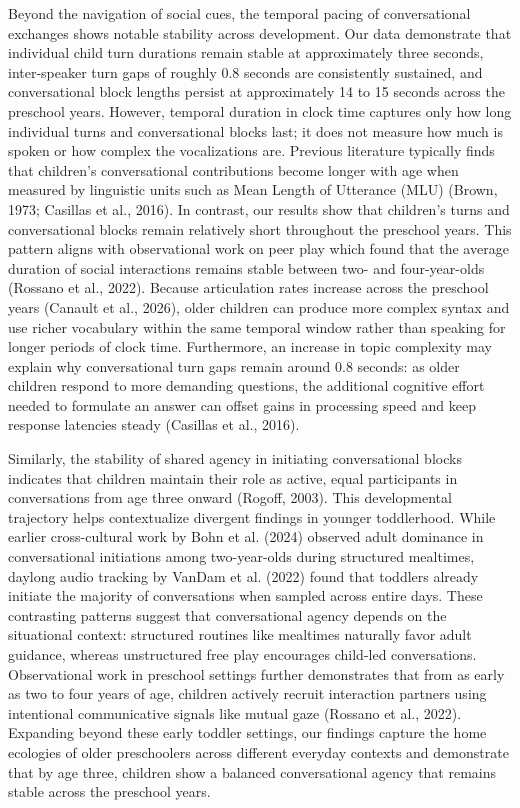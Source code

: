 \documentclass[
  english,
  12pt,
  man,floatsintext]{apa6}
\begin{document}
Beyond the navigation of social cues, the temporal pacing of conversational exchanges shows notable stability across development. Our data demonstrate that individual child turn durations remain stable at approximately three seconds, inter-speaker turn gaps of roughly 0.8 seconds are consistently sustained, and conversational block lengths persist at approximately 14 to 15 seconds across the preschool years. However, temporal duration in clock time captures only how long individual turns and conversational blocks last; it does not measure how much is spoken or how complex the vocalizations are. Previous literature typically finds that children's conversational contributions become longer with age when measured by linguistic units such as Mean Length of Utterance (MLU) (Brown, 1973; Casillas et al., 2016). In contrast, our results show that children's turns and conversational blocks remain relatively short throughout the preschool years. This pattern aligns with observational work on peer play which found that the average duration of social interactions remains stable between two- and four-year-olds (Rossano et al., 2022). Because articulation rates increase across the preschool years (Canault et al., 2026), older children can produce more complex syntax and use richer vocabulary within the same temporal window rather than speaking for longer periods of clock time. Furthermore, an increase in topic complexity may explain why conversational turn gaps remain around 0.8 seconds: as older children respond to more demanding questions, the additional cognitive effort needed to formulate an answer can offset gains in processing speed and keep response latencies steady (Casillas et al., 2016).

Similarly, the stability of shared agency in initiating conversational blocks indicates that children maintain their role as active, equal participants in conversations from age three onward (Rogoff, 2003). This developmental trajectory helps contextualize divergent findings in younger toddlerhood. While earlier cross-cultural work by Bohn et al. (2024) observed adult dominance in conversational initiations among two-year-olds during structured mealtimes, daylong audio tracking by VanDam et al. (2022) found that toddlers already initiate the majority of conversations when sampled across entire days. These contrasting patterns suggest that conversational agency depends on the situational context: structured routines like mealtimes naturally favor adult guidance, whereas unstructured free play encourages child-led conversations. Observational work in preschool settings further demonstrates that from as early as two to four years of age, children actively recruit interaction partners using intentional communicative signals like mutual gaze (Rossano et al., 2022). Expanding beyond these early toddler settings, our findings capture the home ecologies of older preschoolers across different everyday contexts and demonstrate that by age three, children show a balanced conversational agency that remains stable across the preschool years.
\end{document}
